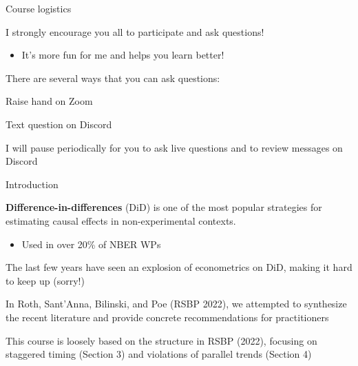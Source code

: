 \documentclass[aspectratio = 169, 12pt]{beamer}
\begin{document}
\begin{frame}{Course logistics}
  \begin{wideitemize}
    \item
    I strongly encourage you all to participate and ask questions!
    \begin{itemize}
      \item
            It's more fun for me and helps you learn better!
    \end{itemize}
    \item
    There are several ways that you can ask questions:

    \begin{wideitemize}
      \item
      Raise hand on Zoom

      \item
      Text question on Discord
    \end{wideitemize}

    \item
    I will pause periodically for you to ask live questions and to review messages on Discord
  \end{wideitemize}

\end{frame}


\begin{frame}{Introduction}
  \begin{wideitemize}
    \item
    \textbf{Difference-in-differences} (DiD) is one of the most popular strategies for estimating causal effects in non-experimental contexts.
    \medskip
    \begin{itemize}
      \item
            Used in over 20\% of NBER WPs \citep{currie_technology_2020}
    \end{itemize}

    \item
    The last few years have seen an explosion of econometrics on DiD, making it hard to keep up (sorry!)

    \item
    In Roth, Sant'Anna, Bilinski, and Poe (RSBP 2022), we attempted to synthesize the recent literature and provide concrete recommendations for practitioners


    \item
    This course is loosely based on the structure in RSBP (2022), focusing on staggered timing (Section 3) and violations of parallel trends (Section 4)
  \end{wideitemize}
\end{frame}
\end{document}
